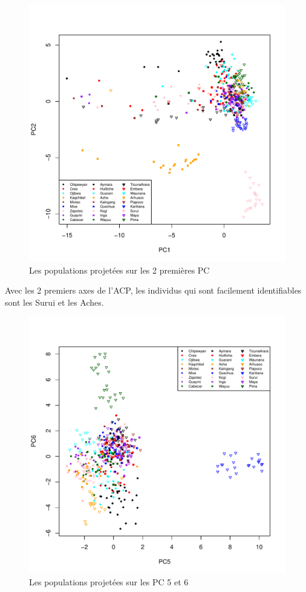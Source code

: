 \documentclass[a4paper, 12pt]{article}
\begin{document}
\begin{enumerate}
\begin{figure}[!h]
\begin{center}
\includegraphics[scale=1]{acp12.pdf}
\caption{Les populations projetées sur les 2 premières PC}
\end{center}
\end{figure}

Avec les 2 premiers axes de l'ACP, les individus qui sont facilement identifiables sont les Surui et les Aches.
\pagebreak
\begin{figure}[!h]
\begin{center}
\includegraphics[scale=1]{acp56.pdf}
\caption{Les populations projetées sur les PC 5 et 6}
\end{center}
\end{figure}


\end{enumerate}
\end{document}
